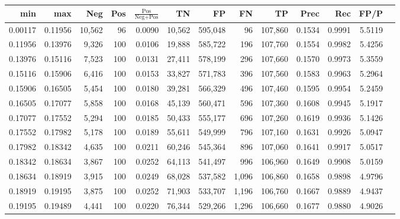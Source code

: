 \begin{tabular}{rrrrrrrrrrrrr}
\toprule
    min &     max &    Neg & Pos & $\frac{\text{Pos}}{\text{Neg}+\text{Pos}}$ &      TN &      FP &      FN &      TP &   Prec &    Rec &   FP/P \\
\midrule
0.00117 & 0.11956 & 10,562 &  96 &                                     0.0090 &  10,562 & 595,048 &      96 & 107,860 & 0.1534 & 0.9991 & 5.5119 \\
0.11956 & 0.13976 &  9,326 & 100 &                                     0.0106 &  19,888 & 585,722 &     196 & 107,760 & 0.1554 & 0.9982 & 5.4256 \\
0.13976 & 0.15116 &  7,523 & 100 &                                     0.0131 &  27,411 & 578,199 &     296 & 107,660 & 0.1570 & 0.9973 & 5.3559 \\
0.15116 & 0.15906 &  6,416 & 100 &                                     0.0153 &  33,827 & 571,783 &     396 & 107,560 & 0.1583 & 0.9963 & 5.2964 \\
0.15906 & 0.16505 &  5,454 & 100 &                                     0.0180 &  39,281 & 566,329 &     496 & 107,460 & 0.1595 & 0.9954 & 5.2459 \\
0.16505 & 0.17077 &  5,858 & 100 &                                     0.0168 &  45,139 & 560,471 &     596 & 107,360 & 0.1608 & 0.9945 & 5.1917 \\
0.17077 & 0.17552 &  5,294 & 100 &                                     0.0185 &  50,433 & 555,177 &     696 & 107,260 & 0.1619 & 0.9936 & 5.1426 \\
0.17552 & 0.17982 &  5,178 & 100 &                                     0.0189 &  55,611 & 549,999 &     796 & 107,160 & 0.1631 & 0.9926 & 5.0947 \\
0.17982 & 0.18342 &  4,635 & 100 &                                     0.0211 &  60,246 & 545,364 &     896 & 107,060 & 0.1641 & 0.9917 & 5.0517 \\
0.18342 & 0.18634 &  3,867 & 100 &                                     0.0252 &  64,113 & 541,497 &     996 & 106,960 & 0.1649 & 0.9908 & 5.0159 \\
0.18634 & 0.18919 &  3,915 & 100 &                                     0.0249 &  68,028 & 537,582 &   1,096 & 106,860 & 0.1658 & 0.9898 & 4.9796 \\
0.18919 & 0.19195 &  3,875 & 100 &                                     0.0252 &  71,903 & 533,707 &   1,196 & 106,760 & 0.1667 & 0.9889 & 4.9437 \\
0.19195 & 0.19489 &  4,441 & 100 &                                     0.0220 &  76,344 & 529,266 &   1,296 & 106,660 & 0.1677 & 0.9880 & 4.9026 \\

\end{tabular}
